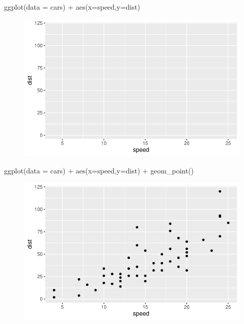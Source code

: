 \documentclass[
  letterpaper,
  DIV=11,
  numbers=noendperiod]{scrartcl}
\newenvironment{Shaded}{\begin{snugshade}}{\end{snugshade}}
\newcommand{\AttributeTok}[1]{\textcolor[rgb]{0.40,0.45,0.13}{#1}}
\newcommand{\FunctionTok}[1]{\textcolor[rgb]{0.28,0.35,0.67}{#1}}
\newcommand{\NormalTok}[1]{\textcolor[rgb]{0.00,0.23,0.31}{#1}}
\newcommand{\SpecialCharTok}[1]{\textcolor[rgb]{0.37,0.37,0.37}{#1}}
\begin{document}
\begin{Shaded}
\begin{Highlighting}[]
\FunctionTok{ggplot}\NormalTok{(}\AttributeTok{data =}\NormalTok{ cars) }\SpecialCharTok{+} 
  \FunctionTok{aes}\NormalTok{(}\AttributeTok{x=}\NormalTok{speed,}\AttributeTok{y=}\NormalTok{dist) }
\end{Highlighting}
\end{Shaded}

\begin{figure}[H]

{\centering \includegraphics{class05_labreport_files/figure-pdf/unnamed-chunk-4-2.pdf}

}

\end{figure}

\begin{Shaded}
\begin{Highlighting}[]
\FunctionTok{ggplot}\NormalTok{(}\AttributeTok{data =}\NormalTok{ cars) }\SpecialCharTok{+} 
  \FunctionTok{aes}\NormalTok{(}\AttributeTok{x=}\NormalTok{speed,}\AttributeTok{y=}\NormalTok{dist) }\SpecialCharTok{+} 
  \FunctionTok{geom\_point}\NormalTok{()}
\end{Highlighting}
\end{Shaded}

\begin{figure}[H]

{\centering \includegraphics{class05_labreport_files/figure-pdf/unnamed-chunk-4-3.pdf}

}

\end{figure}
\end{document}
